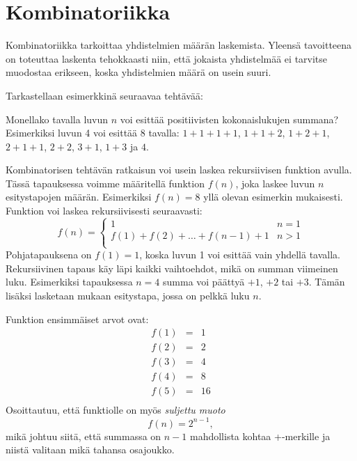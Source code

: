 \chapter{Kombinatoriikka}


Kombinatoriikka tarkoittaa yhdistelmien määrän laskemista.
Yleensä tavoitteena on toteuttaa laskenta
tehokkaasti niin, että jokaista yhdistelmää
ei tarvitse muodostaa erikseen, koska
yhdistelmien määrä on usein suuri.

Tarkastellaan esimerkkinä seuraavaa tehtävää:
\begin{task}
Monellako tavalla luvun $n$ voi esittää positiivisten
kokonaislukujen summana?
Esimerkiksi luvun 4 voi esittää 8 tavalla:
$1+1+1+1$, $1+1+2$, $1+2+1$, $2+1+1$,
$2+2$, $3+1$, $1+3$ ja $4$.
\end{task}

Kombinatorisen tehtävän ratkaisun voi usein
laskea rekursiivisen funktion avulla.
Tässä tapauksessa voimme määritellä funktion $f(n)$,
joka laskee luvun $n$ esitystapojen määrän.
Esimerkiksi $f(n)=8$ yllä olevan esimerkin mukaisesti.
Funktion voi laskea rekursiivisesti seuraavasti:
\begin{equation*}
    f(n) = \begin{cases}
               1               & n = 1\\
               f(1)+f(2)+\ldots+f(n-1)+1 & n > 1\\
           \end{cases}
\end{equation*}
Pohjatapauksena on $f(1)=1$,
koska luvun 1 voi esittää vain yhdellä tavalla.
Rekursiivinen tapaus käy läpi
kaikki vaihtoehdot,
mikä on summan viimeinen luku.
Esimerkiksi tapauksessa $n=4$ summa voi päättyä
$+1$, $+2$ tai $+3$.
Tämän lisäksi lasketaan mukaan esitystapa,
jossa on pelkkä luku $n$.

Funktion ensimmäiset arvot ovat:
\[
\begin{array}{lcl}
f(1) & = & 1 \\
f(2) & = & 2 \\
f(3) & = & 4 \\
f(4) & = & 8 \\
f(5) & = & 16 \\
\end{array}
\] 
Osoittautuu, että funktiolle on myös \textit{suljettu muoto}
\[
f(n)=2^{n-1},
\]
mikä johtuu siitä, että summassa on $n-1$ mahdollista
kohtaa +-merkille ja niistä valitaan mikä tahansa osajoukko.


